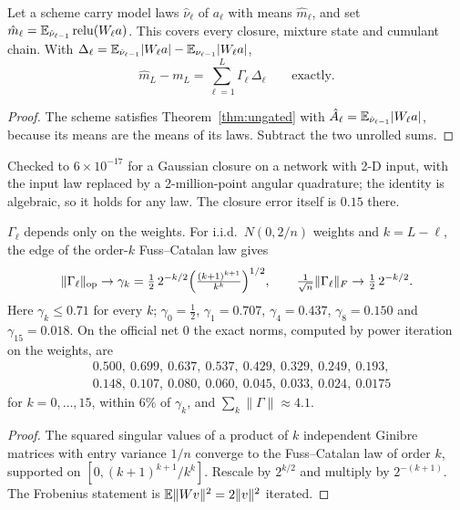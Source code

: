 \begin{theorem}\label{thm:err}
Let a scheme carry model laws $\hat\nu_\ell$ of $a_\ell$ with means $\hat m_\ell$, and set $\hat m_\ell=\mathbb{E}_{\hat\nu_{\ell-1}}
\operatorname{relu}(W_\ell a)$. This covers every closure, mixture state and cumulant chain. With
$\Delta_\ell=\mathbb{E}_{\hat\nu_{\ell-1}}|W_\ell a|-\mathbb{E}_{\nu_{\ell-1}}|W_\ell a|$,
\[
\hat m_L-m_L=\sum_{\ell=1}^L\Gamma_\ell\,\Delta_\ell\qquad\text{exactly.}
\]
\end{theorem}
\begin{proof}
The scheme satisfies Theorem~\ref{thm:ungated} with $\hat A_\ell=\mathbb{E}_{\hat\nu_{\ell-1}}|W_\ell a|$, because its means are the
means of its laws. Subtract the two unrolled sums.
\end{proof}

Checked to $6\times10^{-17}$ for a Gaussian closure on a network with 2-D input, with the input law replaced by a
2-million-point angular quadrature; the identity is algebraic, so it holds for any law. The closure error itself is $0.15$
there.

\begin{proposition}\label{prop:gamma}
$\Gamma_\ell$ depends only on the weights. For i.i.d.\ $N(0,2/n)$ weights and $k=L-\ell$, the edge of the order-$k$
Fuss--Catalan law gives
\[
\|\Gamma_\ell\|_{\rm op}\to\gamma_k=\tfrac12\,2^{-k/2}\Big(\tfrac{(k+1)^{k+1}}{k^k}\Big)^{1/2},
\qquad \tfrac1{\sqrt n}\|\Gamma_\ell\|_F\to\tfrac12\,2^{-k/2}.
\]
Here $\gamma_k\le0.71$ for every $k$; $\gamma_0=\frac12$, $\gamma_1=0.707$, $\gamma_4=0.437$, $\gamma_8=0.150$ and
$\gamma_{15}=0.018$. On the official net 0 the exact norms, computed by power iteration on the weights, are
\[
\begin{aligned}
&0.500,\ 0.699,\ 0.637,\ 0.537,\ 0.429,\ 0.329,\ 0.249,\ 0.193,\\
&0.148,\ 0.107,\ 0.080,\ 0.060,\ 0.045,\ 0.033,\ 0.024,\ 0.0175
\end{aligned}
\]
for $k=0,\dots,15$, within $6\%$ of $\gamma_k$, and $\sum_k\|\Gamma\|\approx4.1$.
\end{proposition}
\begin{proof}
The squared singular values of a product of $k$ independent Ginibre matrices with entry variance $1/n$ converge to the
Fuss--Catalan law of order $k$, supported on $[0,(k+1)^{k+1}/k^k]$. Rescale by $2^{k/2}$ and multiply by $2^{-(k+1)}$. The
Frobenius statement is $\mathbb{E}\|Wv\|^2=2\|v\|^2$ iterated.
\end{proof}

